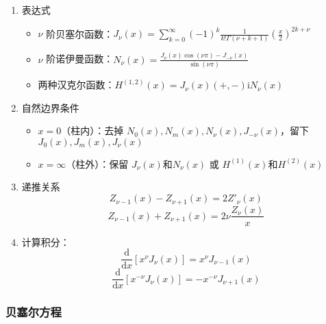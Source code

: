 \documentclass{article}
\begin{document}
\begin{enumerate}
    \item 表达式 \begin{itemize}
              \item $\nu$ 阶贝塞尔函数：$J_\nu(x)=\sum^\infty_{k=0}(-1)^k\frac{1}{k!\Gamma(\nu+k+1)}(\frac{x}{2})^{2k+\nu}$
              \item $\nu$ 阶诺伊曼函数：$N_\nu(x)=\frac{J_\nu(x)\cos(\nu\pi)-J_{-\nu}(x)}{\sin(\nu \pi)}$
              \item 两种汉克尔函数：$H^{(1, 2)}(x)=J_\nu(x)(+, -)\mathrm{i}N_\nu(x)$
          \end{itemize}
    \item 自然边界条件 \begin{itemize}
              \item $x=0$（柱内）：去掉 $N_0(x), N_m(x), N_\nu(x), J_{-\nu}(x)$，留下 $J_0(x), J_m(x), J_\nu(x)$
              \item $x=\infty$（柱外）：保留 $J_\nu(x)和N_\nu(x)$ 或 $H^{(1)}(x)和H^{(2)}(x)$
          \end{itemize}
    \item 递推关系 $$Z_{\nu-1}(x)-Z_{\nu+1}(x)=2Z'_\nu(x)$$ $$Z_{\nu-1}(x)+Z_{\nu+1}(x)=2\nu\frac{Z_\nu(x)}{x}$$
    \item 计算积分：$$\frac{\mathrm{d}}{\mathrm{d}x}[x^\nu J_\nu(x)]=x^\nu J_{\nu-1}(x)$$ $$\frac{\mathrm{d}}{\mathrm{d}x}[x^{-\nu}J_\nu(x)]=-x^{-\nu}J_{\nu+1}(x)$$
\end{enumerate}

\subsubsection{贝塞尔方程}
\end{document}
